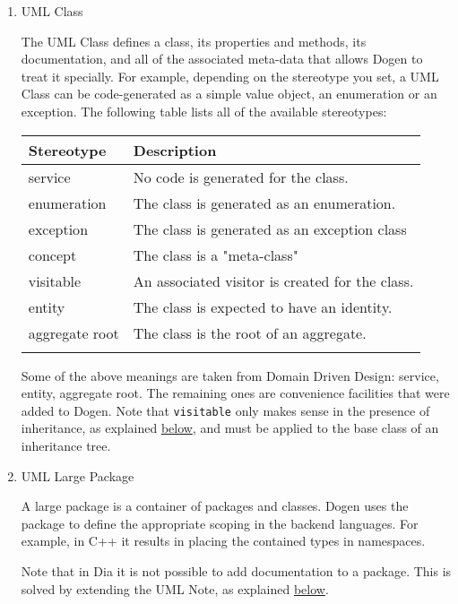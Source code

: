 \documentclass[11pt]{article}
\begin{document}
\begin{enumerate}
\item UML Class
\label{sec-3-4-2-1}

The UML Class defines a class, its properties and methods, its
documentation, and all of the associated meta-data that allows Dogen
to treat it specially. For example, depending on the stereotype you
set, a UML Class can be code-generated as a simple value object, an
enumeration or an exception. The following table lists all of the
available stereotypes:

\begin{center}
\begin{tabular}{ll}
Stereotype & Description\\
\hline
service & No code is generated for the class.\\
enumeration & The class is generated as an enumeration.\\
exception & The class is generated as an exception class\\
concept & The class is a "meta-class"\\
visitable & An associated visitor is created for the class.\\
entity & The class is expected to have an identity.\\
aggregate root & The class is the root of an aggregate.\\
 & \\
\end{tabular}
\end{center}

Some of the above meanings are taken from Domain Driven Design:
service, entity, aggregate root. The remaining ones are convenience
facilities that were added to Dogen. Note that \texttt{visitable} only makes
sense in the presence of inheritance, as explained \href{https://github.com/DomainDrivenConsulting/dogen/blob/master/doc/manual/manual.org#uml-generalization}{below}, and must be
applied to the base class of an inheritance tree.

\item UML Large Package
\label{sec-3-4-2-2}

A large package is a container of packages and classes. Dogen uses the
package to define the appropriate scoping in the backend
languages. For example, in C++ it results in placing the contained
types in namespaces.

Note that in Dia it is not possible to add documentation to a
package. This is solved by extending the UML Note, as explained \href{https://github.com/DomainDrivenConsulting/dogen/blob/master/doc/manual/manual.org#uml-note}{below}.


\end{enumerate}
\end{document}
